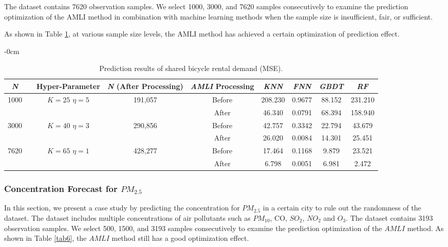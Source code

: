 \documentclass[mathematics,article,accept,pdftex,moreauthors]{Definitions/mdpi}
\begin{document}
The dataset contains 7620 observation samples. We select 1000, 3000, and 7620 samples consecutively to examine the prediction optimization of the AMLI method in combination with machine learning methods when the sample size is insufficient, fair, or sufficient.

As shown in Table \ref{tab5}, at various sample size levels, the AMLI method has achieved a certain optimization of prediction effect.

\begin{table}[H]

	\caption{Prediction results of shared bicycle rental demand (MSE).}
	\label{tab5}
	\begin{adjustwidth}{-\extralength}{0cm}\centering


	
	
	{\renewcommand{\tabcolsep}{3.05mm}
		\small\begin{tabular}{ccccccccc}
			\toprule
			\emph{\textbf{N}}  & & \textbf{Hyper-Parameter} &  \emph{\textbf{N}} \textbf{(After Processing)} & \textbf{\emph{AMLI} Processing} & \emph{\textbf{KNN}} & \emph{\textbf{FNN}} & \emph{\textbf{GBDT}} & \emph{\textbf{RF}}    \\\midrule
			\multirow{2}{1cm}{1000} & & \multirow{2}{1.3cm}{$K=25$ $\eta=5$} & \multirow{2}{1cm}{191,057} & Before & 208.230 & 0.9677 & 88.152 & 231.210\\
			& & & &  After & 46.340 & 0.0791 & 68.394 & 158.940 \\
			\multirow{2}{1cm}{3000} & & \multirow{2}{1.3cm}{$K=40$ $\eta=3$} & \multirow{2}{1cm}{290,856} & Before & 42.757 & 0.3342 & 22.794 & 43.679\\
			& & & &  After & 26.020 & 0.0084 & 14.301 & 25.451 \\
			\multirow{2}{1cm}{7620} & & \multirow{2}{1.3cm}{$K=65$ $\eta=1$} & \multirow{2}{1cm}{428,277} & Before & 17.464 & 0.1168 & 9.879 & 23.521\\
			& & & &  After & 6.798 & 0.0051 & 6.981 & 2.472 \\
			\bottomrule
	\end{tabular}}
	\end{adjustwidth}
\end{table}


\subsubsection{Concentration Forecast for $PM_{2.5}$}

In this section, we present a case study by predicting the concentration for $PM_{2.5}$ in a certain city to rule out the randomness of the dataset. The dataset includes multiple concentrations of air pollutants such as $PM_{10}$, CO, $SO_{2}$, $NO_{2}$ and $O_{3}$. The dataset contains 3193 observation samples. We select 500, 1500, and 3193 samples consecutively to examine the prediction optimization of the $AMLI$ method. As shown in Table \ref{tab6}, the $AMLI$ method still has a good optimization effect.
\end{document}

